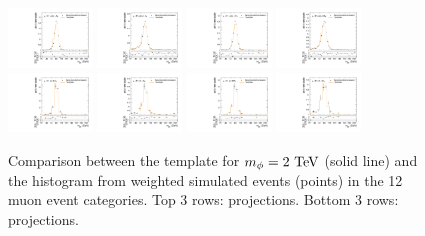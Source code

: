 \begin{figure}[htpb]
  \includegraphics[width=0.2\textwidth]{fig/2Dfit/templateVsReco_RadToWW2000_r0_MJ_mu_HP_nobb_LDy.pdf}
  \includegraphics[width=0.2\textwidth]{fig/2Dfit/templateVsReco_RadToWW2000_r0_MJ_mu_LP_nobb_LDy.pdf}
  \includegraphics[width=0.2\textwidth]{fig/2Dfit/templateVsReco_RadToWW2000_r0_MJ_mu_HP_nobb_HDy.pdf}
  \includegraphics[width=0.2\textwidth]{fig/2Dfit/templateVsReco_RadToWW2000_r0_MJ_mu_LP_nobb_HDy.pdf}\\
  \includegraphics[width=0.2\textwidth]{fig/2Dfit/templateVsReco_RadToWW2000_r0_MJ_mu_HP_vbf_LDy.pdf}
  \includegraphics[width=0.2\textwidth]{fig/2Dfit/templateVsReco_RadToWW2000_r0_MJ_mu_LP_vbf_LDy.pdf}
  \includegraphics[width=0.2\textwidth]{fig/2Dfit/templateVsReco_RadToWW2000_r0_MJ_mu_HP_vbf_HDy.pdf}
  \includegraphics[width=0.2\textwidth]{fig/2Dfit/templateVsReco_RadToWW2000_r0_MJ_mu_LP_vbf_HDy.pdf}\\
  \caption{
    Comparison between the \ggF\RadtoWW template for $m_{\Rad}=2\unit{TeV}$ (solid line) and the histogram from weighted simulated events (points) in the 12 muon event categories.
    Top 3 rows: \MVV projections.
    Bottom 3 rows: \MJ projections.
  }
  \label{fig:1dtemplateVsReco_RadToWW2000_Run2}
\end{figure}

